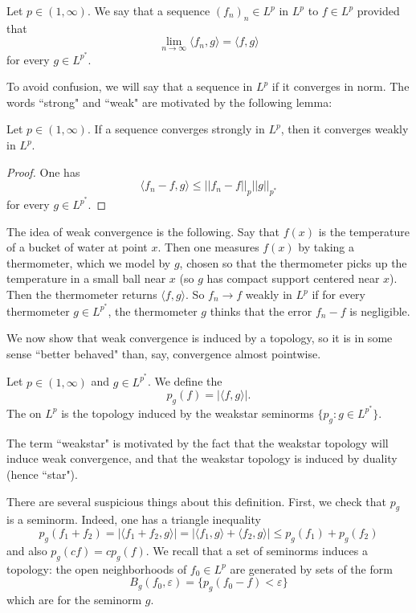 \begin{definition}
Let $p \in (1, \infty)$. We say that a sequence $(f_n)_n \in L^p$  in $L^p$ to $f \in L^p$ provided that
\[\lim_{n \to \infty} \langle f_n, g\rangle = \langle f, g\rangle\]
for every $g \in L^{p^*}$.
\end{definition}

To avoid confusion, we will say that a sequence  in $L^p$ if it converges in norm.
The words ``strong" and ``weak" are motivated by the following lemma:

\begin{lemma}
Let $p \in (1, \infty)$. If a sequence converges strongly in $L^p$, then it converges weakly in $L^p$.
\end{lemma}
\begin{proof}
One has
\[\langle f_n - f, g \rangle \leq ||f_n - f||_p ||g||_{p^*}\]
for every $g \in L^{p^*}$.
\end{proof}

The idea of weak convergence is the following. Say that $f(x)$ is the temperature of a bucket of water at point $x$.
Then one measures $f(x)$ by taking a thermometer, which we model by $g$, chosen so that the thermometer picks up the temperature in a small ball near $x$ (so $g$ has compact support centered near $x$).
Then the thermometer returns $\langle f, g\rangle$.
So $f_n \to f$ weakly in $L^p$ if for every thermometer $g \in L^{p^*}$, the thermometer $g$ thinks that the error $f_n - f$ is negligible.

We now show that weak convergence is induced by a topology, so it is in some sense ``better behaved" than, say, convergence almost pointwise.

\begin{definition}
Let $p \in (1, \infty)$ and $g \in L^{p^*}$.
We define the 
\[p_g(f) = |\langle f, g\rangle|.\]
The  on $L^p$ is the topology induced by the weakstar seminorms $\{p_g: g \in L^{p^*}\}$.
\end{definition}

The term ``weakstar" is motivated by the fact that the weakstar topology will induce weak convergence, and that the weakstar topology is induced by duality (hence ``star").

There are several suspicious things about this definition. First, we check that $p_g$ is a seminorm. Indeed, one has a triangle inequality
\[p_g(f_1 + f_2) = |\langle f_1 + f_2, g\rangle| = |\langle f_1, g\rangle + \langle f_2, g\rangle| \leq p_g(f_1) + p_g(f_2)\]
and also $p_g(cf) = cp_g(f)$.
We recall that a set of seminorms induces a topology: the open neighborhoods of $f_0 \in L^p$ are generated by sets of the form
\[B_g(f_0, \varepsilon) = \{p_g(f_0 - f) < \varepsilon\}\]
which are  for the seminorm $g$.

